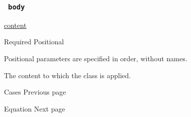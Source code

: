 \subsubsection{\texorpdfstring{\texttt{\ body\ }}{ body }}\label{parameters-body}

\href{/docs/reference/foundations/content/}{content}

{Required} {{ Positional }}

\label{parameters-body-positional-tooltip}
Positional parameters are specified in order, without names.

The content to which the class is applied.

\href{/docs/reference/math/cases/}{\pandocbounded{}}

{ Cases } { Previous page }

\href{/docs/reference/math/equation/}{\pandocbounded{}}

{ Equation } { Next page }
